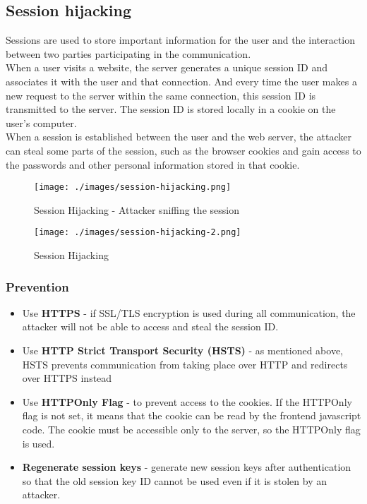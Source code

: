 \newpage
\subsection{Session hijacking}
Sessions are used to store important information for the user and the interaction between two parties participating in the communication. \\
When a user visits a website, the server generates a unique session ID and associates it with the user and that connection. And every time the user makes a new request to the server within the same connection, this session ID is transmitted to the server. The session ID is stored locally in a cookie on the user's computer. \\
When a session is established between the user and the web server, the attacker can steal some parts of the session, such as the browser cookies and gain access to the passwords and other personal information stored in that cookie. \\

\begin{figure}[H]
    \centering
    \texttt{[image: ./images/session-hijacking.png]}
    \caption{Session Hijacking - Attacker sniffing the session} 
\end{figure}


\begin{figure}[H]
    \centering
    \texttt{[image: ./images/session-hijacking-2.png]}
    \caption{Session Hijacking} 
\end{figure}

\subsubsection{Prevention}
\begin{itemize}
    \item Use \textbf{HTTPS} - if SSL/TLS encryption is used during all communication, the attacker will not be able to access and steal the session ID.
    \item Use \textbf{HTTP Strict Transport Security (HSTS)} - as mentioned above, HSTS prevents communication from taking place over HTTP and redirects over HTTPS instead
    \item Use \textbf{HTTPOnly Flag} - to prevent access to the cookies. If the HTTPOnly flag is not set, it means that the cookie can be read by the frontend javascript code. 
    The cookie must be accessible only to the server, so the HTTPOnly flag is used.
    \item \textbf{Regenerate session keys} - generate new session keys after authentication so that the old session key ID cannot be used even if it is stolen by an attacker. \\
\end{itemize}

